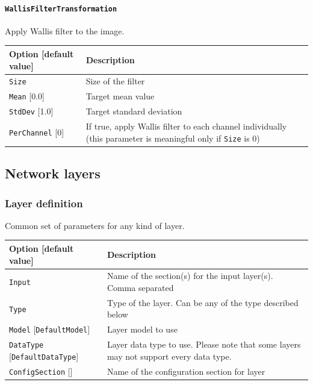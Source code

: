 \documentclass[a4paper,11pt,oneside]{article}
\newcommand{\iponly}{\reversemarginpar
    \marginnote{\color{listletiblue}\normalfont\scriptsize
    {\ttfamily{}\hyperref[sec:N2D2-IP]{\color{listletiblue}N2D2 IP}} \emph{only}}}
\begin{document}
\paragraph{\texorpdfstring{%
\lstinline[basicstyle=\ttfamily\bfseries]!WallisFilterTransformation!%
\protect\iponly}{WallisFilterTransformation}}
Apply Wallis filter to the image.

\begin{center}
 \begin{tabular}{| p{5cm} | p{10cm} | }
 \hline
 Option [default value] & Description\\
 \hline\hline
  \cellcolor{requiredcolor}\lstinline!Size! & Size of the filter \\
  \lstinline!Mean! [0.0] & Target mean value \\
  \lstinline!StdDev! [1.0] & Target standard deviation \\
  \lstinline!PerChannel! [0] & If true, apply Wallis filter to each channel
  individually (this parameter is meaningful only if \lstinline!Size! is 0) \\
 \hline
\end{tabular}
\end{center}

\subsection{Network layers}

\subsubsection{Layer definition}
Common set of parameters for any kind of layer.

\begin{center}
 \begin{tabular}{| p{5cm} | p{10cm} | }
 \hline
 Option [default value] & Description\\
 \hline\hline
  \cellcolor{requiredcolor}\lstinline!Input! & Name of the section(s) for the
  input layer(s). Comma separated \\
  \cellcolor{requiredcolor}\lstinline!Type! & Type of the layer. Can be any of
  the type described below \\
  \lstinline!Model! [\lstinline!DefaultModel!] & Layer model to use \\
  \lstinline!DataType! [\lstinline!DefaultDataType!] & Layer data type to use.
  Please note that some layers may not support every data type. \\
  \lstinline!ConfigSection! [] & Name of the configuration section for layer \\
 \hline
\end{tabular}
\end{center}
\end{document}
